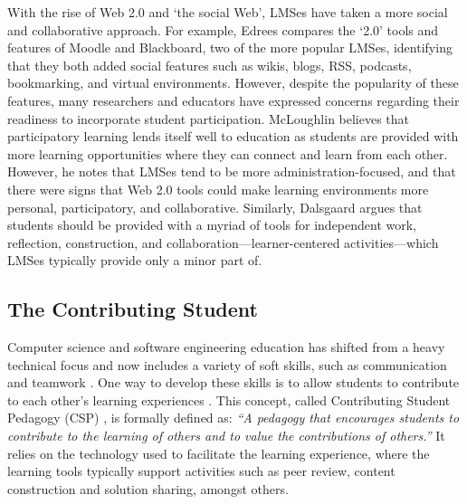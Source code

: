 With the rise of Web 2.0 and `the social Web', LMSes have taken a more social and collaborative approach. For example, Edrees\cite{edrees2013elearning} compares the `2.0' tools and features of Moodle and Blackboard, two of the more popular LMSes, identifying that they both added social features such as wikis, blogs, RSS, podcasts, bookmarking, and virtual environments. However, despite the popularity of these features, many researchers and educators have expressed concerns regarding their readiness to incorporate student participation. McLoughlin \cite{mcloughlin2007social} believes that participatory learning lends itself well to education as students are provided with more learning opportunities where they can connect and learn from each other. However, he notes that LMSes tend to be more administration-focused, and that there were signs that Web 2.0 tools could make learning environments more personal, participatory, and collaborative. Similarly, Dalsgaard \cite{dalsgaard2006social} argues that students should be provided with a myriad of tools for independent work, reflection, construction, and collaboration---learner-centered activities---which LMSes typically provide only a minor part of.

\subsection{The Contributing Student}
Computer science and software engineering education has shifted from a heavy technical focus and now includes a variety of soft skills, such as communication and teamwork \cite{jazayeri2004education}. One way to develop these skills is to allow students to contribute to each other's learning experiences \cite{hamer2006some}. This concept, called Contributing Student Pedagogy (CSP) \cite{hamer2008contributing}, is formally defined as: \textit{``A pedagogy that encourages students to contribute to the learning of others and to value the contributions of others.''} It relies on the technology used to facilitate the learning experience, where the learning tools typically support activities such as peer review, content construction and solution sharing, amongst others.

